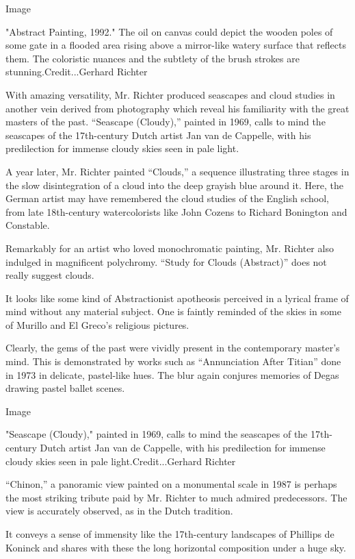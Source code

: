 Image

"Abstract Painting, 1992." The oil on canvas could depict the wooden
poles of some gate in a flooded area rising above a mirror-like watery
surface that reflects them. The coloristic nuances and the subtlety of
the brush strokes are stunning.Credit...Gerhard Richter

With amazing versatility, Mr. Richter produced seascapes and cloud
studies in another vein derived from photography which reveal his
familiarity with the great masters of the past. ``Seascape (Cloudy),''
painted in 1969, calls to mind the seascapes of the 17th-century Dutch
artist Jan van de Cappelle, with his predilection for immense cloudy
skies seen in pale light.

A year later, Mr. Richter painted ``Clouds,'' a sequence illustrating
three stages in the slow disintegration of a cloud into the deep grayish
blue around it. Here, the German artist may have remembered the cloud
studies of the English school, from late 18th-century watercolorists
like John Cozens to Richard Bonington and Constable.

Remarkably for an artist who loved monochromatic painting, Mr. Richter
also indulged in magnificent polychromy. ``Study for Clouds (Abstract)''
does not really suggest clouds.

It looks like some kind of Abstractionist apotheosis perceived in a
lyrical frame of mind without any material subject. One is faintly
reminded of the skies in some of Murillo and El Greco's religious
pictures.

Clearly, the gems of the past were vividly present in the contemporary
master's mind. This is demonstrated by works such as ``Annunciation
After Titian'' done in 1973 in delicate, pastel-like hues. The blur
again conjures memories of Degas drawing pastel ballet scenes.

Image

"Seascape (Cloudy)," painted in 1969, calls to mind the seascapes of the
17th-century Dutch artist Jan van de Cappelle, with his predilection for
immense cloudy skies seen in pale light.Credit...Gerhard Richter

``Chinon,'' a panoramic view painted on a monumental scale in 1987 is
perhaps the most striking tribute paid by Mr. Richter to much admired
predecessors. The view is accurately observed, as in the Dutch
tradition.

It conveys a sense of immensity like the 17th-century landscapes of
Phillips de Koninck and shares with these the long horizontal
composition under a huge sky.

